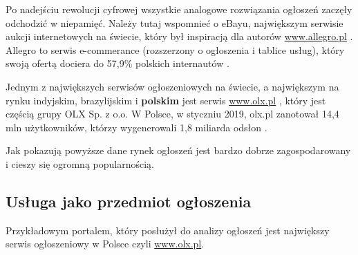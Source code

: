 \documentclass[12pt]{article}
\numberwithin{figure}{section}
\begin{document}
\begin{sloppypar}
Po nadejściu rewolucji cyfrowej wszystkie analogowe rozwiązania ogłoszeń zaczęły odchodzić w niepamięć. Należy tutaj wspomnieć o eBayu, największym serwisie aukcji internetowych na świecie, który był inspiracją dla autorów \url{www.allegro.pl} \cite{allegro-wywiad}. Allegro to serwis e-commerance (rozszerzony o ogłoszenia i tablice usług), który swoją ofertą dociera do 57,9\% polskich internautów \cite{allegro-liczby}. 

Jednym z największych serwisów ogłoszeniowych na świecie, a największym na rynku indyjskim, brazylijskim i \textbf{polskim} jest serwis \url{www.olx.pl} \cite{olx-wywiad}, który jest częścią grupy OLX Sp. z o.o. W Polsce, w styczniu 2019, olx.pl zanotował 14,4 mln użytkowników, którzy wygenerowali 1,8 miliarda odsłon \cite{olx-liczby}.

Jak pokazują powyższe dane rynek ogłoszeń jest bardzo dobrze zagospodarowany i cieszy się ogromną popularnością.
\subsection{Usługa jako przedmiot ogłoszenia}
Przykładowym portalem, który posłużył do analizy ogłoszeń jest największy serwis ogłoszeniowy w Polsce czyli \url{www.olx.pl}.


\end{sloppypar}
\end{document}
